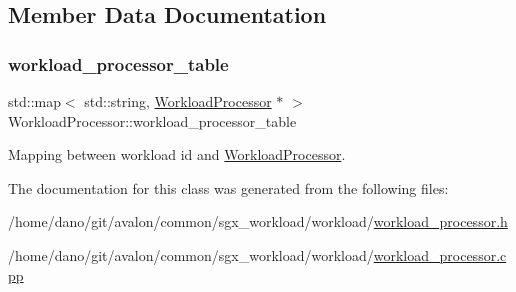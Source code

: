 \subsection{Member Data Documentation}
\mbox{\label{classWorkloadProcessor_a7d27005403d3bead28be816490ddf6a2}} 
\subsubsection{\texorpdfstring{workload\+\_\+processor\+\_\+table}{workload\_processor\_table}}
{\footnotesize\ttfamily std\+::map$<$ std\+::string, \hyperlink{classWorkloadProcessor}{Workload\+Processor} $\ast$ $>$ Workload\+Processor\+::workload\+\_\+processor\+\_\+table\hspace{0.3cm}{\ttfamily [static]}}

Mapping between workload id and \hyperlink{classWorkloadProcessor}{Workload\+Processor}. 

The documentation for this class was generated from the following files\+:\begin{DoxyCompactItemize}
\item 
/home/dano/git/avalon/common/sgx\+\_\+workload/workload/\hyperlink{workload__processor_8h}{workload\+\_\+processor.\+h}\item 
/home/dano/git/avalon/common/sgx\+\_\+workload/workload/\hyperlink{workload__processor_8cpp}{workload\+\_\+processor.\+cpp}\end{DoxyCompactItemize}
